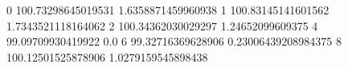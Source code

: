 0 100.73298645019531 1.6358871459960938
1 100.83145141601562 1.7343521118164062
2 100.34362030029297 1.24652099609375
4 99.09709930419922 0.0
6 99.32716369628906 0.23006439208984375
8 100.12501525878906 1.0279159545898438
